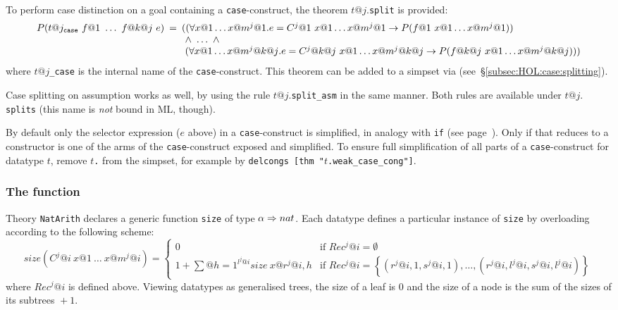 To perform case distinction on a goal containing a \texttt{case}-construct,
the theorem $t@j.$\texttt{split} is provided:
\[
\begin{array}{@{}rcl@{}}
P(t@j_\mathtt{case}~f@1~\dots~f@{k@j}~e) &\!\!\!=&
\!\!\! ((\forall x@1 \dots x@{m^j@1}. e = C^j@1~x@1\dots x@{m^j@1} \to
                             P(f@1~x@1\dots x@{m^j@1})) \\
&&\!\!\! ~\land~ \dots ~\land \\
&&~\!\!\! (\forall x@1 \dots x@{m^j@{k@j}}. e = C^j@{k@j}~x@1\dots x@{m^j@{k@j}} \to
                             P(f@{k@j}~x@1\dots x@{m^j@{k@j}})))
\end{array}
\]
where $t@j$\texttt{_case} is the internal name of the \texttt{case}-construct.
This theorem can be added to a simpset via 
(see~{\S}\ref{subsec:HOL:case:splitting}).

Case splitting on assumption works as well, by using the rule
$t@j.$\texttt{split_asm} in the same manner.  Both rules are available under
$t@j.$\texttt{splits} (this name is \emph{not} bound in ML, though).

\begin{warn}%
  By default only the selector expression ($e$ above) in a
  \texttt{case}-construct is simplified, in analogy with \texttt{if} (see
  page~\pageref{if-simp}). Only if that reduces to a constructor is one of
  the arms of the \texttt{case}-construct exposed and simplified. To ensure
  full simplification of all parts of a \texttt{case}-construct for datatype
  $t$, remove $t$\texttt{.} from the simpset, for
  example by \texttt{delcongs [thm "$t$.weak_case_cong"]}.
\end{warn}

\subsubsection{The function }\label{sec:HOL:size}

Theory \texttt{NatArith} declares a generic function \texttt{size} of type
$\alpha\Rightarrow nat$.  Each datatype defines a particular instance of \texttt{size}
by overloading according to the following scheme:
\[
size(C^j@i~x@1~\dots~x@{m^j@i}) = \!
\left\{
\begin{array}{ll}
0 & \!\mbox{if $Rec^j@i = \emptyset$} \\
1+\sum\limits@{h=1}^{l^j@i}size~x@{r^j@{i,h}} &
 \!\mbox{if $Rec^j@i = \left\{\left(r^j@{i,1},s^j@{i,1}\right),\ldots,
  \left(r^j@{i,l^j@i},s^j@{i,l^j@i}\right)\right\}$}
\end{array}
\right.
\]
where $Rec^j@i$ is defined above.  Viewing datatypes as generalised trees, the
size of a leaf is 0 and the size of a node is the sum of the sizes of its
subtrees ${}+1$.

